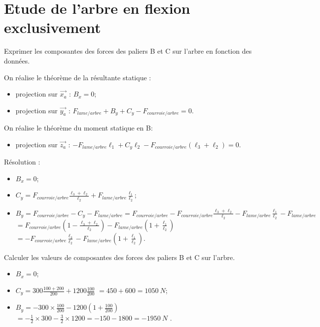 \documentclass[11pt]{article}
\begin{document}
\section{Etude de l'arbre en flexion exclusivement}

\UPSTIquestion* Exprimer les composantes des forces des paliers B et C sur l'arbre en fonction des données.

\begin{UPSTIcorrige}
On réalise le théorème de la résultante statique : 
\begin{itemize}
\item projection sur $\overrightarrow{x_a}$ : $B_x   = 0$;
\item projection sur $\overrightarrow{y_a}$ : $F_{lame/arbre} + B_y + C_y - F_{courroie/arbre}  = 0$. 
\end{itemize}
On réalise le théorème du moment statique en B: 
\begin{itemize}
\item projection sur $\overrightarrow{z_a}$ : $-F_{lame/arbre} \ell_1 + C_y \ell_2 - F_{courroie/arbre}\left(\ell_3 + \ell_2\right)=0$.
\end{itemize}

Résolution :
\begin{itemize}
\item $B_x   = 0$;
\item $ C_y = F_{courroie/arbre}\frac{\ell_3 + \ell_2}{\ell_2} + F_{lame/arbre} \frac{\ell_1}{\ell_2}$;
\item $B_y = F_{courroie/arbre} -  C_y -  F_{lame/arbre} = F_{courroie/arbre} -F_{courroie/arbre}\frac{\ell_3 + \ell_2}{\ell_2} - F_{lame/arbre} \frac{\ell_1}{\ell_2}-  F_{lame/arbre} $
$= F_{courroie/arbre}\left(1-\frac{\ell_3 + \ell_2}{\ell_2}\right) - F_{lame/arbre} \left(1+\frac{\ell_1}{\ell_2}\right) $
$= -F_{courroie/arbre}\frac{\ell_3}{\ell_2} - F_{lame/arbre} \left(1+\frac{\ell_1}{\ell_2}\right) $.
\end{itemize}

\end{UPSTIcorrige}

\UPSTIquestion Calculer les valeurs de composantes des forces des paliers B et C sur l'arbre.

\begin{UPSTIcorrige}
\begin{itemize}
\item $B_x   = 0$;
\item $C_y = 300 \frac{100 + 200}{200} + 1200 \frac{100}{200}$ $= 450 + 600 = \SI{1050}{N}$;
\item $B_y = -300\times \frac{100}{200} - 1200 \left(1+\frac{100}{200}\right) $ 
$=-\frac{1}{2}\times 300 - \frac{3}{2}\times 1200 = -150 - 1800 = -\SI{1950}{N} $ .
\end{itemize}\end{UPSTIcorrige}
\end{document}
